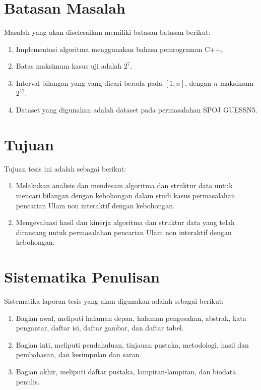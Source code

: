 \section {Batasan Masalah}
Masalah yang akan diselesaikan memiliki batasan-batasan berikut:

\begin {enumerate}
  \item Implementasi algoritma menggunakan bahasa pemrograman C++.
  \item Batas maksimum kasus uji adalah $2^7$.
  \item Interval bilangan yang yang dicari berada pada $[1,n]$, dengan $n$ maksimum $2^{12}$.
  \item Dataset yang digunakan adalah dataset pada permasalahan SPOJ GUESSN5.
\end {enumerate}


\section {Tujuan}
Tujuan tesis ini adalah sebagai berikut:

\begin{enumerate}
  \item Melakukan analisis dan mendesain algoritma dan struktur data untuk mencari bilangan dengan kebohongan dalam studi kasus permasalahan pencarian Ulam non interaktif dengan kebohongan.
  \item Mengevaluasi hasil dan kinerja algoritma dan struktur data yang telah dirancang untuk permasalahan pencarian Ulam non interaktif dengan kebohongan.
\end{enumerate}


\section {Sistematika Penulisan}
Sistematika laporan tesis yang akan digunakan adalah sebagai berikut:

\begin{enumerate}
\item Bagian awal, meliputi halaman depan, halaman pengesahan, abstrak, kata pengantar, daftar isi, daftar gambar, dan daftar tabel.
\item Bagian inti, meliputi pendahuluan, tinjauan pustaka, metodologi, hasil dan pembahasan, dan kesimpulan dan saran.
\item Bagian akhir, meliputi daftar pustaka, lampiran-lampiran, dan biodata penulis.
\end{enumerate}